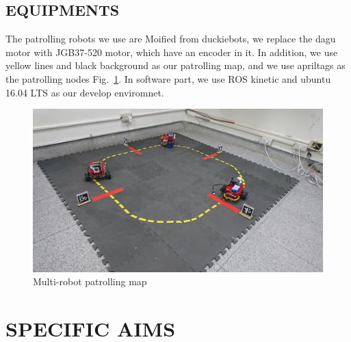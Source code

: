 \documentclass[letterpaper, 10 pt, conference]{ieeeconf}  %
\begin{document}
\subsection{EQUIPMENTS} 

The patrolling robots we use are Moified from duckiebots, we replace the dagu motor with JGB37-520 motor, which have an encoder in it. In addition, we use yellow lines and black background as our patrolling map, and we use apriltags as the patrolling nodes Fig.~\ref{figure:map}. In software part, we use ROS kinetic and ubuntu 16.04 LTS as our develop enviromnet.

\begin{figure}[t] %
\includegraphics[width=1\columnwidth]{map}
\centering
\caption{Multi-robot patrolling map}
\label{figure:map}
\end{figure}

\section{SPECIFIC AIMS}
\end{document}
